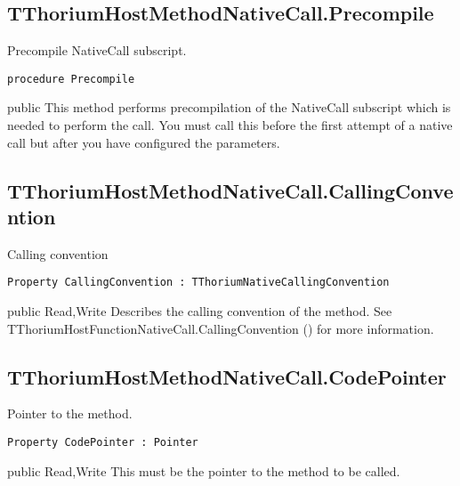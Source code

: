 \subsection{TThoriumHostMethodNativeCall.Precompile}
\label{thoriumcorepkg:thorium:tthoriumhostmethodnativecall:precompile}
\begin{FPCList}
\Synopsis
Precompile NativeCall subscript.\Declaration 

\begin{verbatim}
procedure Precompile
\end{verbatim}
\Visibility
public
\Description
This method performs precompilation of the NativeCall subscript which is needed to perform the call. You must call this before the first attempt of a native call but after you have configured the parameters.\end{FPCList}
\subsection{TThoriumHostMethodNativeCall.CallingConvention}
\label{thoriumcorepkg:thorium:tthoriumhostmethodnativecall:callingconvention}
\begin{FPCList}
\Synopsis
Calling convention\Declaration 

\begin{verbatim}
Property CallingConvention : TThoriumNativeCallingConvention
\end{verbatim}
\Visibility
public
\Access
Read,Write
\Description
Describes the calling convention of the method. See TThoriumHostFunctionNativeCall.CallingConvention (\pageref{thoriumcorepkg:thorium:tthoriumhostfunctionnativecall:callingconvention}) for more information.\end{FPCList}
\subsection{TThoriumHostMethodNativeCall.CodePointer}
\label{thoriumcorepkg:thorium:tthoriumhostmethodnativecall:codepointer}
\begin{FPCList}
\Synopsis
Pointer to the method.\Declaration 

\begin{verbatim}
Property CodePointer : Pointer
\end{verbatim}
\Visibility
public
\Access
Read,Write
\Description
This must be the pointer to the method to be called.\end{FPCList}

